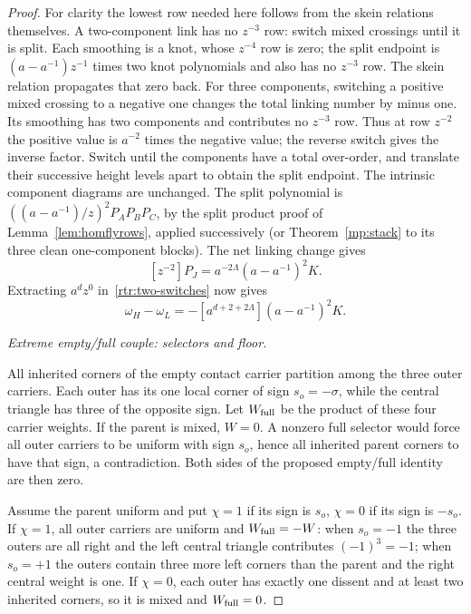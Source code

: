 \begin{proof}
For clarity the lowest row needed here follows from the skein
relations themselves. A two-component link has no $z^{-3}$ row:
switch mixed crossings until it is split. Each smoothing is a knot,
whose $z^{-4}$ row is zero; the split endpoint is
$(a-a^{-1})z^{-1}$ times two knot polynomials and also has no
$z^{-3}$ row. The skein relation propagates that zero back.
For three components, switching a positive mixed crossing to a
negative one changes the total linking number by minus one. Its
smoothing has two components and contributes no $z^{-3}$ row.
Thus at row $z^{-2}$ the positive value is $a^{-2}$ times the
negative value; the reverse switch gives the inverse factor.
Switch until the components have a total over-order, and translate
their successive height levels apart to obtain the split endpoint.
The intrinsic component diagrams are unchanged. The split polynomial
is $((a-a^{-1})/z)^2P_AP_BP_C$, by the split product proof of
Lemma~\ref{lem:homflyrows}, applied successively (or
Theorem~\ref{mp:stack} to its three clean one-component blocks).
The net linking change gives
\begin{equation}\label{rtr:three-component-row}
 [z^{-2}]P_J=a^{-2\Lambda}(a-a^{-1})^2K.
\end{equation}
Extracting $a^dz^0$ in~\eqref{rtr:two-switches} now gives
\begin{equation}\label{rtr:extreme-extraction}
 \omega_H-\omega_L
  =-[a^{d+2+2\Lambda}](a-a^{-1})^2K.
\end{equation}

\par\medskip\noindent\emph{Extreme empty/full couple: selectors and floor.}\par
All inherited corners of the empty contact carrier partition among
the three outer carriers. Each outer has its one local corner of
sign $s_o=-\sigma$, while the central triangle has three of the
opposite sign. Let $W_{\rm full}$ be the product of these four
carrier weights. If the parent is mixed, $W=0$. A nonzero full
selector would force all outer carriers to be uniform with sign
$s_o$, hence all inherited parent corners to have that sign, a
contradiction. Both sides of the proposed empty/full identity are
then zero.

Assume the parent uniform and put $\chi=1$ if its sign is $s_o$,
$\chi=0$ if its sign is $-s_o$. If $\chi=1$, all outer carriers
are uniform and $W_{\rm full}=-W$: when $s_o=-1$ the three
outers are all right and the left central triangle contributes
$(-1)^3=-1$; when $s_o=+1$ the outers contain three more left
corners than the parent and the right central weight is one.
If $\chi=0$, each outer has exactly one dissent and at least two
inherited corners, so it is mixed and $W_{\rm full}=0$.


\end{proof}
